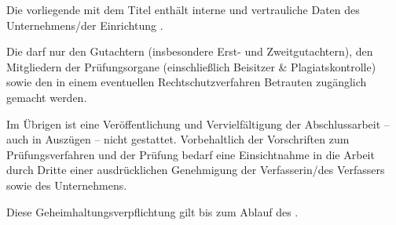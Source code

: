 Die vorliegende \art mit dem Titel \titel enthält interne und vertrauliche Daten des Unternehmens/der Einrichtung \unternehmen.

Die \art darf nur den Gutachtern (insbesondere Erst- und Zweitgutachtern), den Mitgliedern der Prüfungsorgane (einschließlich Beisitzer \& Plagiatskontrolle) sowie den in einem eventuellen Rechtschutzverfahren Betrauten zugänglich gemacht werden.

Im Übrigen ist eine Veröffentlichung und Vervielfältigung der Abschlussarbeit -- auch in Auszügen -- nicht gestattet. Vorbehaltlich der Vorschriften zum Prüfungsverfahren und der Prüfung bedarf eine Einsichtnahme in die Arbeit durch Dritte einer ausdrücklichen Genehmigung der Verfasserin/des Verfassers sowie des \oa Unternehmens.

Diese Geheimhaltungsverpflichtung gilt bis zum Ablauf des \datumAblaufSperrvermerk.
